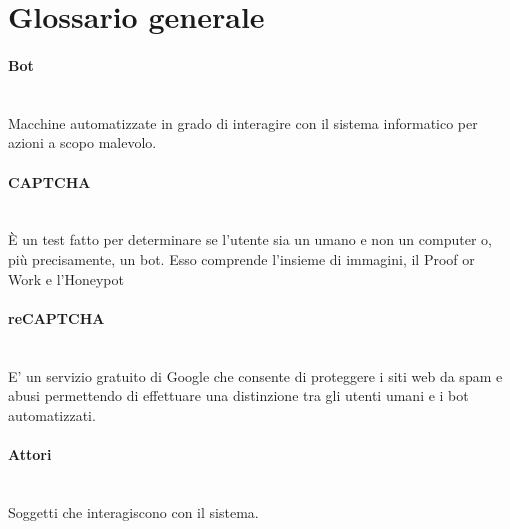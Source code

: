 \section{Glossario generale}

\paragraph{Bot}~\smallskip \\
Macchine automatizzate in grado di interagire con il sistema informatico per azioni a scopo malevolo.

\paragraph{CAPTCHA}~\smallskip \\
È un test fatto per determinare se l'utente sia un umano e non un computer o, più precisamente, un bot.
Esso comprende l'insieme di immagini, il Proof or Work e l'Honeypot

\paragraph{reCAPTCHA}~\smallskip \\
E' un servizio gratuito di Google che consente di proteggere i siti web da spam e abusi permettendo di effettuare una distinzione tra gli utenti umani e i bot automatizzati.

\paragraph{Attori}~\smallskip \\
Soggetti che interagiscono con il sistema.

